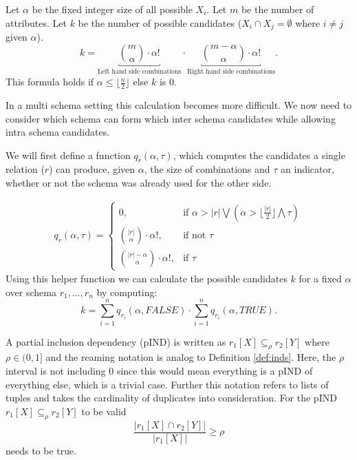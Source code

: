 \begin{definition}\label{def:candidates}
    Let $\alpha$ be the fixed integer size of all possible $X_i$. Let $m$ be the number of attributes. Let $k$ be the number of possible candidates ($X_i \cap X_j = \emptyset$ where $i \not = j$ given $\alpha$).
    \[
        k = \underbracket{\binom{m}{\alpha}\cdot \alpha ! }_{\text{Left hand side combinations}} \cdot \underbracket{\binom{m-\alpha}{\alpha}\cdot \alpha!}_\text{Right hand side combinations}.
    \]
    This formula holds if $\alpha \leq \lfloor \frac{n}{2} \rfloor$ else $k$ is $0$.
\end{definition}

\noindent In a multi schema setting this calculation becomes more difficult. We now need to consider which schema can form which inter schema candidates while allowing intra schema candidates.
\begin{definition}\label{def:candidates-MS}
    We will first define a function $q_r(\alpha, \tau)$, which computes the candidates a single relation ($r$) can produce, given $\alpha$, the size of combinations and $\tau$ an indicator, whether or not the schema was already used for the other side.

    \begin{align*}
        q_r(\alpha, \tau) = \begin{cases}
            0, & \text{if } \alpha > |r| \bigvee (\alpha > \lfloor\frac{|r|}{2}\rfloor \bigwedge \tau)\\
            \binom{|r|}{\alpha}\cdot \alpha!, & \text{if not } \tau \\
            \binom{|r| - \alpha}{\alpha}\cdot \alpha!, & \text{if } \tau
        \end{cases}
    \end{align*}
    Using this helper function we can calculate the possible candidates $k$ for a fixed $\alpha$ over schema $r_1, \dots, r_n$ by computing:
    $$
        k = \sum\limits_{i = 1}^n q_{r_i}(\alpha, FALSE) \cdot \sum\limits_{i = 1}^n q_{r_i}(\alpha, TRUE).
    $$
\end{definition}

\begin{definition}\label{def:pinds}
    A partial inclusion dependency (pIND) is written as $r_1[X] \subseteq_{\rho} r_2[Y]$ where $\rho \in (0, 1]$ and the reaming notation is analog to Definition \ref{def:inds}. Here, the $\rho$ interval is not including $0$ since this would mean everything is a pIND of everything else, which is a trivial case. Further this notation refers to lists of tuples and takes the cardinality of duplicates into consideration. For the pIND $r_1[X] \subseteq_{\rho} r_2[Y]$ to be valid
    $$
        \frac{|r_1[X] \cap r_2[Y]|}
            {|r_1[X]|} \geq \rho
    $$
    needs to be true.
\end{definition}

